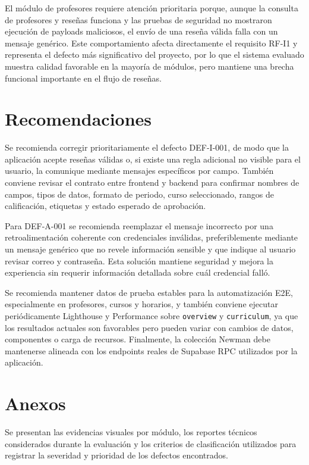 \documentclass[11pt,spanish]{article}
\begin{document}
El módulo de profesores requiere atención prioritaria porque, aunque la consulta de profesores y reseñas funciona y las pruebas de seguridad no mostraron ejecución de payloads maliciosos, el envío de una reseña válida falla con un mensaje genérico. Este comportamiento afecta directamente el requisito RF-I1 y representa el defecto más significativo del proyecto, por lo que el sistema evaluado muestra calidad favorable en la mayoría de módulos, pero mantiene una brecha funcional importante en el flujo de reseñas.

\section{Recomendaciones}

Se recomienda corregir prioritariamente el defecto DEF-I-001, de modo que la aplicación acepte reseñas válidas o, si existe una regla adicional no visible para el usuario, la comunique mediante mensajes específicos por campo. También conviene revisar el contrato entre frontend y backend para confirmar nombres de campos, tipos de datos, formato de periodo, curso seleccionado, rangos de calificación, etiquetas y estado esperado de aprobación.

Para DEF-A-001 se recomienda reemplazar el mensaje incorrecto por una retroalimentación coherente con credenciales inválidas, preferiblemente mediante un mensaje genérico que no revele información sensible y que indique al usuario revisar correo y contraseña. Esta solución mantiene seguridad y mejora la experiencia sin requerir información detallada sobre cuál credencial falló.

Se recomienda mantener datos de prueba estables para la automatización E2E, especialmente en profesores, cursos y horarios, y también conviene ejecutar periódicamente Lighthouse y Performance sobre \texttt{overview} y \texttt{curriculum}, ya que los resultados actuales son favorables pero pueden variar con cambios de datos, componentes o carga de recursos. Finalmente, la colección Newman debe mantenerse alineada con los endpoints reales de Supabase RPC utilizados por la aplicación.

\section{Anexos}

Se presentan las evidencias visuales por módulo, los reportes técnicos considerados durante la evaluación y los criterios de clasificación utilizados para registrar la severidad y prioridad de los defectos encontrados.
\end{document}

